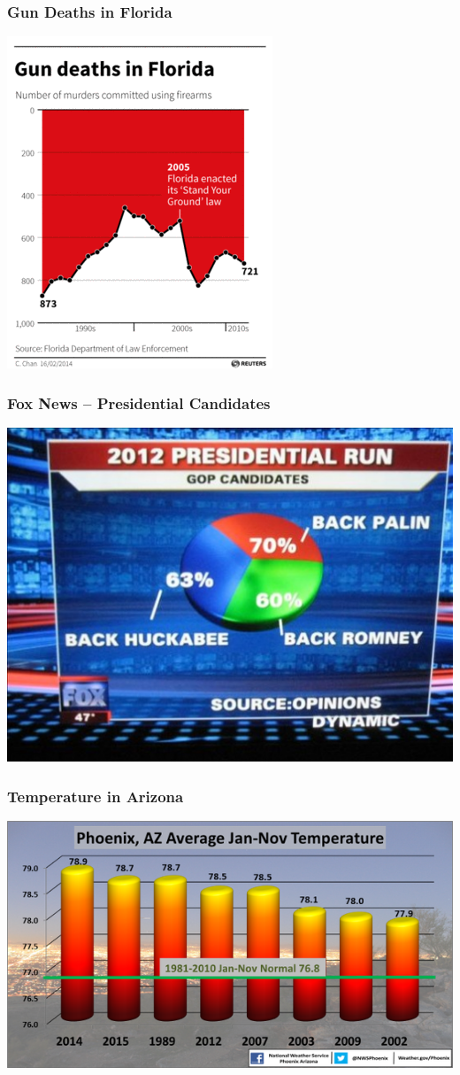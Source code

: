 \documentclass{beamer} %
\begin{document}
\begin{frame}\frametitle{Gun Deaths in Florida}
	\centering
	\includegraphics[width=0.6\linewidth]{guns.png}
\end{frame}


\begin{frame}\frametitle{Fox News -- Presidential Candidates}
	\centering
	\includegraphics[width=0.8\linewidth]{foxnews.jpg}
\end{frame}


\begin{frame}\frametitle{Temperature in Arizona}
	\centering
	\includegraphics[width=0.9\linewidth]{temp.png}
\end{frame}
\end{document}
